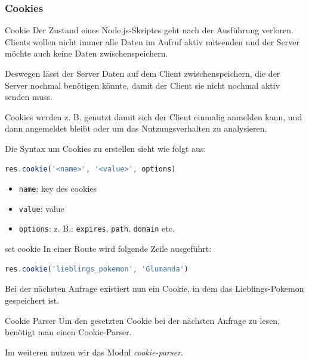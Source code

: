 \subsubsection{Cookies}

\begin{defi}{Cookie}
    Der Zustand eines Node.js-Skriptes geht nach der Ausführung verloren.
    Clients wollen nicht immer alle Daten im Aufruf aktiv mitsenden und der Server möchte auch keine Daten zwischenspeichern.

    Deswegen lässt der Server Daten auf dem Client zwischenspeichern, die der Server nochmal benötigen könnte, damit der Client sie nicht nochmal aktiv senden muss.

    Cookies werden z. B. genutzt damit sich der Client einmalig anmelden kann, und dann angemeldet bleibt oder um das Nutzungsverhalten zu analysieren.

    Die Syntax um Cookies zu erstellen sieht wie folgt aus:
    \begin{lstlisting}[language=JavaScript]
        res.cookie('<name>', '<value>', options)
    \end{lstlisting}

    \begin{itemize}
        \item \texttt{name}: key des cookies
        \item \texttt{value}: value
        \item \texttt{options}: z. B.: \texttt{expires}, \texttt{path}, \texttt{domain} etc.
    \end{itemize}
\end{defi}

\begin{example}{set cookie}
    In einer Route wird folgende Zeile ausgeführt:

    \begin{lstlisting}[language=JavaScript]
        res.cookie('lieblings_pokemon', 'Glumanda')
    \end{lstlisting}

    Bei der nächsten Anfrage existiert nun ein Cookie, in dem das Lieblings-Pokemon gespeichert ist.
\end{example}

\begin{bonus}{Cookie Parser}
    Um den gesetzten Cookie bei der nächsten Anfrage zu lesen, benötigt man einen Cookie-Parser.

    Im weiteren nutzen wir das Modul \emph{cookie-parser}.
\end{bonus}

